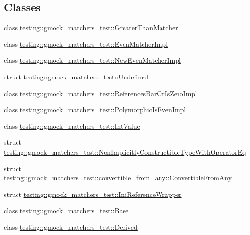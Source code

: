 \subsection*{Classes}
\begin{DoxyCompactItemize}
\item 
class \mbox{\hyperlink{classtesting_1_1gmock__matchers__test_1_1GreaterThanMatcher}{testing\+::gmock\+\_\+matchers\+\_\+test\+::\+Greater\+Than\+Matcher}}
\item 
class \mbox{\hyperlink{classtesting_1_1gmock__matchers__test_1_1EvenMatcherImpl}{testing\+::gmock\+\_\+matchers\+\_\+test\+::\+Even\+Matcher\+Impl}}
\item 
class \mbox{\hyperlink{classtesting_1_1gmock__matchers__test_1_1NewEvenMatcherImpl}{testing\+::gmock\+\_\+matchers\+\_\+test\+::\+New\+Even\+Matcher\+Impl}}
\item 
struct \mbox{\hyperlink{structtesting_1_1gmock__matchers__test_1_1Undefined}{testing\+::gmock\+\_\+matchers\+\_\+test\+::\+Undefined}}
\item 
class \mbox{\hyperlink{classtesting_1_1gmock__matchers__test_1_1ReferencesBarOrIsZeroImpl}{testing\+::gmock\+\_\+matchers\+\_\+test\+::\+References\+Bar\+Or\+Is\+Zero\+Impl}}
\item 
class \mbox{\hyperlink{classtesting_1_1gmock__matchers__test_1_1PolymorphicIsEvenImpl}{testing\+::gmock\+\_\+matchers\+\_\+test\+::\+Polymorphic\+Is\+Even\+Impl}}
\item 
class \mbox{\hyperlink{classtesting_1_1gmock__matchers__test_1_1IntValue}{testing\+::gmock\+\_\+matchers\+\_\+test\+::\+Int\+Value}}
\item 
struct \mbox{\hyperlink{structtesting_1_1gmock__matchers__test_1_1NonImplicitlyConstructibleTypeWithOperatorEq}{testing\+::gmock\+\_\+matchers\+\_\+test\+::\+Non\+Implicitly\+Constructible\+Type\+With\+Operator\+Eq}}
\item 
struct \mbox{\hyperlink{structtesting_1_1gmock__matchers__test_1_1convertible__from__any_1_1ConvertibleFromAny}{testing\+::gmock\+\_\+matchers\+\_\+test\+::convertible\+\_\+from\+\_\+any\+::\+Convertible\+From\+Any}}
\item 
struct \mbox{\hyperlink{structtesting_1_1gmock__matchers__test_1_1IntReferenceWrapper}{testing\+::gmock\+\_\+matchers\+\_\+test\+::\+Int\+Reference\+Wrapper}}
\item 
class \mbox{\hyperlink{classtesting_1_1gmock__matchers__test_1_1Base}{testing\+::gmock\+\_\+matchers\+\_\+test\+::\+Base}}
\item 
class \mbox{\hyperlink{classtesting_1_1gmock__matchers__test_1_1Derived}{testing\+::gmock\+\_\+matchers\+\_\+test\+::\+Derived}}

\end{DoxyCompactItemize}

